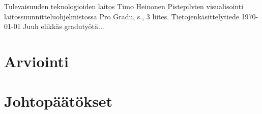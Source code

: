 \newpage
\begin{tiivistelma}%
        {Tulevaisuuden teknologioiden laitos}%
        {Timo Heinonen}%
        {Pistepilvien visualisointi laitossuunnitteluohjelmistossa}
        {Pro Gradu, \pageref{LastPage} s., 3 liites.}%
        {Tietojenkäsittelytiede}%
        {\today}%
	Juuh elikkäs gradutyötä...
\end{tiivistelma}

\tableofcontents %
\newpage












\section{Arviointi}



\section{Johtopäätökset}









\renewcommand{\baselinestretch}{1}\large\normalsize





